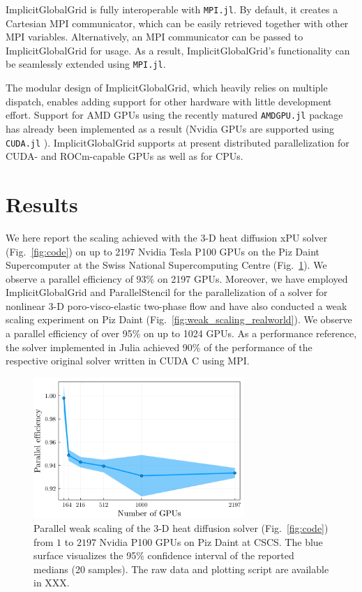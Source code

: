 \documentclass{juliacon}
\begin{document}
ImplicitGlobalGrid is fully interoperable with \texttt{MPI.jl}. By default, it creates a Cartesian MPI communicator, which can be easily retrieved together with other MPI variables. Alternatively, an MPI communicator can be passed to ImplicitGlobalGrid for usage. As a result, ImplicitGlobalGrid's functionality can be seamlessly extended using \texttt{MPI.jl}.

The modular design of ImplicitGlobalGrid, which heavily relies on multiple dispatch, enables adding support for other hardware with little development effort. Support for AMD GPUs using the recently matured \texttt{AMDGPU.jl} package \cite{amdgpu_jl} has already been implemented as a result (Nvidia GPUs are supported using \texttt{CUDA.jl} \cite{besard2018effective}). ImplicitGlobalGrid supports at present distributed parallelization for CUDA- and ROCm-capable GPUs as well as for CPUs.

\section{Results}
We here report the scaling achieved with the 3-D heat diffusion xPU solver (Fig.~\ref{fig:code}) on up to 2197 Nvidia Tesla P100 GPUs on the Piz Daint Supercomputer at the Swiss National Supercomputing Centre (Fig.~\ref{fig:weak_scaling}). We observe a parallel efficiency of 93\% on 2197 GPUs.
Moreover, we have employed ImplicitGlobalGrid and ParallelStencil for the parallelization of a solver for nonlinear 3-D poro-visco-elastic two-phase flow and have also conducted a weak scaling experiment on Piz Daint (Fig.~\ref{fig:weak_scaling_realworld}). We observe a parallel efficiency of over 95\% on up to 1024 GPUs. As a performance reference, the solver implemented in Julia achieved 90\% of the performance of the respective original solver written in CUDA C using MPI.

\begin{figure}[t]
    \centerline{\includegraphics[width=8cm]{julia_gpu_par_eff.png}}
    \caption{Parallel weak scaling of the 3-D heat diffusion solver (Fig.~\ref{fig:code}) from $1$ to $2197$ Nvidia P100 GPUs on Piz Daint at CSCS. The blue surface visualizes the 95\% confidence interval of the reported medians (20 samples). The raw data and plotting script are available in XXX.}
	\label{fig:weak_scaling}
\end{figure}
\end{document}
